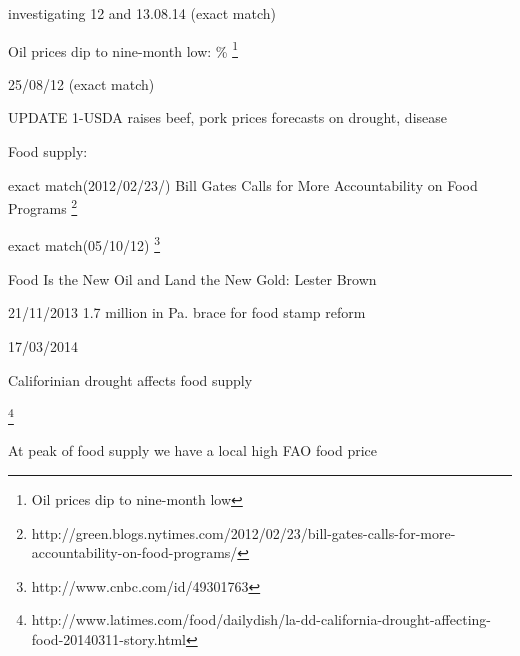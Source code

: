 investigating 12 and 13.08.14 (exact match)

Oil prices dip to nine-month low: \% \footnote{Oil prices dip to nine-month low}


 
 25/08/12  (exact match)
 
 UPDATE 1-USDA raises beef, pork prices forecasts on drought, disease
 
 
 
 Food supply: 
 
 

exact match(2012/02/23/)
Bill Gates Calls for More Accountability on Food Programs
 \footnote{http://green.blogs.nytimes.com/2012/02/23/bill-gates-calls-for-more-accountability-on-food-programs/}
 
 exact match(05/10/12)
 \footnote{http://www.cnbc.com/id/49301763}
 
 Food Is the New Oil and Land the New Gold: Lester Brown
 
 
21/11/2013
1.7 million in Pa. brace for food stamp reform



 
 
17/03/2014

Califorinian drought affects food supply	

 \footnote{http://www.latimes.com/food/dailydish/la-dd-california-drought-affecting-food-20140311-story.html}
 


At peak of food supply we have a local high FAO food price






 
